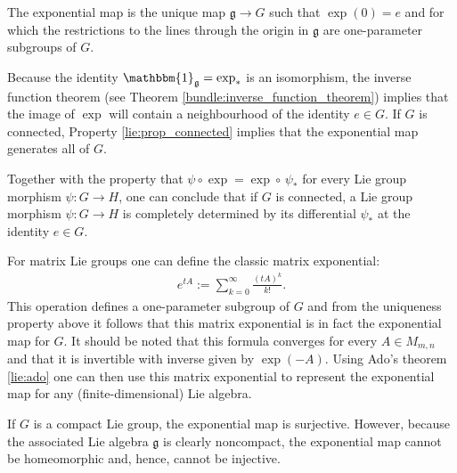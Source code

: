     \begin{property}[Uniqueness]
        The exponential map is the unique map $\mathfrak{g}\rightarrow G$ such that $\exp(0) = e$ and for which the restrictions to the lines through the origin in $\mathfrak{g}$ are one-parameter subgroups of $G$.
    \end{property}
    \begin{result}\label{lie:exp_result}
        Because the identity $\mathbbm{1}_\mathfrak{g}=\exp_\ast$ is an isomorphism, the inverse function theorem (see Theorem \ref{bundle:inverse_function_theorem}) implies that the image of $\exp$ will contain a neighbourhood of the identity $e\in G$. If $G$ is connected, Property \ref{lie:prop_connected} implies that the exponential map generates all of $G$.

        Together with the property that $\psi\circ\exp = \exp\circ\,\psi_\ast$ for every Lie group morphism $\psi:G\rightarrow H$, one can conclude that if $G$ is connected, a Lie group morphism $\psi:G\rightarrow H$ is completely determined by its differential $\psi_\ast$ at the identity $e\in G$.
    \end{result}

    \begin{example}
        For matrix Lie groups one can define the classic matrix exponential:
        \begin{gather}
            e^{tA} := \sum_{k=0}^\infty\frac{(tA)^k}{k!}.
        \end{gather}
        This operation defines a one-parameter subgroup of $G$ and from the uniqueness property above it follows that this matrix exponential is in fact the exponential map for $G$. It should be noted that this formula converges for every $A\in M_{m,n}$ and that it is invertible with inverse given by $\exp(-A)$. Using Ado's theorem \ref{lie:ado} one can then use this matrix exponential to represent the exponential map for any (finite-dimensional) Lie algebra.
    \end{example}
    \begin{remark}
        If $G$ is a compact Lie group, the exponential map is surjective. However, because the associated Lie algebra $\mathfrak{g}$ is clearly noncompact, the exponential map cannot be homeomorphic and, hence, cannot be injective.
    \end{remark}

